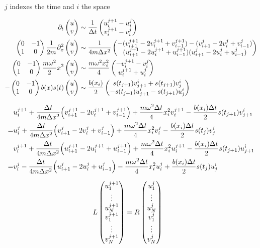 \documentclass[a4paper,10pt]{article}
\begin{document}
$j$ indexes the time and $i$ the space



\begin{align}
	\partial_t
	\pmqty{u\\v}
	&\sim
	\frac{1}{\Delta t}
	\pmqty{u_i^{j+1}-u_i^{j}\\v_i^{j+1}-v_i^{j}}
\\
	\pmqty{0&-1\\1&0}	
	\frac{1}{2m}
	\partial_x^2
	\pmqty{u\\v}
	&\sim
	\frac{1}{4m\Delta x^2}
	\pmqty{
		-(v^{j+1}_{i+1}-2v^{j+1}_{i}+v^{j+1}_{i-1})
		-(v^{j}_{i+1}-2v^{j}_{i}+v^{j}_{i-1})
		\\
		(u^{j+1}_{i+1}-2u^{j+1}_{i}+u^{j+1}_{i-1})
		(u^{j}_{i+1}-2u^{j}_{i}+u^{j}_{i-1})
	}
\\
	\pmqty{0&-1\\1&0}
	\frac{m\omega^2}{2}
	x^2
	\pmqty{u\\v}
	&\sim
	\frac{m\omega^2 x^2_{i}}{4}
	\pmqty{
		-v^{j+1}_i-v^{j}_i
		\\
		u^{j+1}_i+u^{j}_i		
	}
\\
	-
	\pmqty{0&-1\\1&0}
	b(x)
	s(t)
	\pmqty{u\\v}
	&\sim
	\frac{b(x_{i})}{2}
	\pmqty{
		s(t_{j+1})v_{j+1}^i+s(t_{j+1})v_{j}^i
		\\
		-s(t_{j+1})u_{j+1}^i-s(t_{j+1})u_{j}^i
	}
\end{align}







\begin{align}
	&
	u^{j+1}_i
	+
	\frac{\Delta t}{4m\Delta x^2}
	\pqty{
		v^{j+1}_{i+1}-2v^{j+1}_{i}+v^{j+1}_{i-1}
	}
	+
	\frac{m\omega^2\Delta t}{4}
	x^2_{i}v^{j+1}_i
	-
	\frac{b(x_{i})\Delta t}{2}
	s(t_{j+1})v_{j+1}^i
\\
	=&
	u^{j}_i
	+
	\frac{\Delta t}{4m\Delta x^2}
	\pqty{
		v^{j}_{i+1}-2v^{j}_{i}+v^{j}_{i-1}
	}
	+
	\frac{m\omega^2\Delta t}{4}
	x^2_{i}v^{j}_i
	-
	\frac{b(x_{i})\Delta t}{2}
	s(t_{j})v_{j}^i
\\
	&
	v^{j+1}_i
	+
	\frac{\Delta t}{4m\Delta x^2}
	\pqty{
		u^{j+1}_{i+1}-2u^{j+1}_{i}+u^{j+1}_{i-1}
	}
	+
	\frac{m\omega^2\Delta t}{4}
	x^2_{i}u^{j+1}_i
	-
	\frac{b(x_{i})\Delta t}{2}
	s(t_{j+1})u_{j+1}^i
\\
	=&
	v^{j}_i
	-
	\frac{\Delta t}{4m\Delta x^2}
	\pqty{
		u^{j}_{i+1}-2u^{j}_{i}+u^{j}_{i-1}
	}
	-
	\frac{m\omega^2\Delta t}{4}
	x^2_{i}u^{j}_i
	+
	\frac{b(x_{i})\Delta t}{2}
	s(t_{j})u_{j}^i
\end{align}




\begin{align}
	L
	\pmqty{
		u^{j+1}_1
		\\
		\vdots
		\\
		u^{j+1}_N
		\\		
		v^{j+1}_1
		\\
		\vdots
		\\
		v^{j+1}_N
	}
	&=
	R
	\pmqty{
		u^{j}_1
		\\
		\vdots
		\\
		u^{j}_N
		\\		
		v^{j}_1
		\\
		\vdots
		\\
		v^{j}_N
	}
\end{align}
\end{document}
